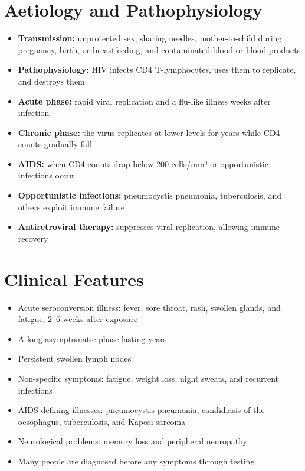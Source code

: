 \section*{Aetiology and Pathophysiology}
\begin{itemize}
    \item \textbf{Transmission:} unprotected sex, sharing needles, mother-to-child during pregnancy, birth, or breastfeeding, and contaminated blood or blood products
    \item \textbf{Pathophysiology:} HIV infects CD4 T-lymphocytes, uses them to replicate, and destroys them
    \item \textbf{Acute phase:} rapid viral replication and a flu-like illness weeks after infection
    \item \textbf{Chronic phase:} the virus replicates at lower levels for years while CD4 counts gradually fall
    \item \textbf{AIDS:} when CD4 counts drop below 200 cells/mm³ or opportunistic infections occur
    \item \textbf{Opportunistic infections:} pneumocystis pneumonia, tuberculosis, and others exploit immune failure
    \item \textbf{Antiretroviral therapy:} suppresses viral replication, allowing immune recovery
\end{itemize}

\section*{Clinical Features}
\begin{itemize}
    \item Acute seroconversion illness: fever, sore throat, rash, swollen glands, and fatigue, 2--6 weeks after exposure
    \item A long asymptomatic phase lasting years
    \item Persistent swollen lymph nodes
    \item Non-specific symptoms: fatigue, weight loss, night sweats, and recurrent infections
    \item AIDS-defining illnesses: pneumocystis pneumonia, candidiasis of the oesophagus, tuberculosis, and Kaposi sarcoma
    \item Neurological problems: memory loss and peripheral neuropathy
    \item Many people are diagnosed before any symptoms through testing
\end{itemize}

